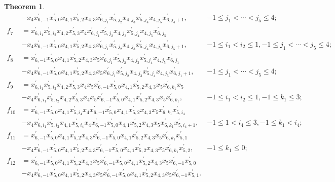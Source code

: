 \documentclass[UTF8]{amsart}
\newtheorem{theorem}[tpcl]{Theorem}
\theoremstyle{definition}
\theoremstyle{remark}
\numberwithin{equation}{section}
\begin{document}
\begin{theorem}
\begin{align*}
    &-x_4x_{6,-1}^{'}x_{5,0}^{'}x_{4,1}x_{5,2}^{'}x_{4,3}x_{6,j_1}^{'}x_{5,j_2}^{'}x_{4,j_3}x_{5,j_4}^{'}x_{4,j_5}x_{6,j_4+1}^{'},&-1\leq   j_1<\cdots<j_5\leq 4;\\
f_7&=x_{6,i_1}^{'}x_{5,i_2}^{'}x_{4,2}x_{5,3}^{'}x_{4}x_{6,j_1}^{'}x_{5,j_2}^{'}x_{4,j_3}x_{5,j_4}^{'}x_{4,j_5}x_{6,j_5}^{'}&\\
    &-x_4x_{6,-1}^{'}x_{5,0}^{'}x_{4,1}x_{5,2}^{'}x_{4,3}x_{6,j_1}^{'}x_{5,j_2}^{'}x_{4,j_3}x_{5,j_4}^{'}x_{4,j_5}x_{6,j_5+1}^{'},&-1\leq  i_1<i_2\leq 1, -1\leq j_1<\cdots<j_5\leq 4;\\
f_8&=x_{6,-1}^{'}x_{5,0}^{'}x_{4,1}x_{5,2}^{'}x_{4,3}x_5x_{6,j_1}^{'}x_{5,j_2}^{'}x_{4,j_3}x_{5,j_4}^{'}x_{4,j_5}x_{6,j_1}^{'}&\\
    &-x_4x_{6,-1}^{'}x_{5,0}^{'}x_{4,1}x_{5,2}^{'}x_{4,3}x_5x_{6,j_1}^{'}x_{5,j_2}^{'}x_{4,j_3}x_{5,j_4}^{'}x_{4,j_5}x_{6,j_1+1}^{'},& -1\leq  j_1<\cdots<j_5\leq 4;\\
f_9&=x_{6,i_1}^{'}x_{5,i_2}^{'}x_{4,2}x_{5,3}^{'}x_{4}x_5x_{6,-1}^{'}x_{5,0}^{'}x_{4,1}x_{5,2}^{'}x_{4,3}x_5x_{6,k_1}^{'}x_5&\\
    &-x_4x_{6,i_1}^{'}x_{5,i_2}^{'}x_{4,2}x_{5,3}^{'}x_{4}x_5x_{6,-1}^{'}x_{5,0}^{'}x_{4,1}x_{5,2}^{'}x_{4,3}x_5x_{6,k_1}^{'},& -1\leq  i_1<i_2\leq 1,-1\leq k_1\leq 3;\\
f_{10}&=x_{6,-1}^{'}x_{5,0}^{'}x_{4,1}x_{5,i_4}^{'}x_{4}x_{6,-1}^{'}x_{5,0}^{'}x_{4,1}x_{5,2}^{'}x_{4,3}x_5x_{6,k_1}^{'}x_{5,i_4}^{'}&\\
    &-x_4x_{6,i_1}^{'}x_{5,i_2}^{'}x_{4,1}x_{5,i_4}^{'}x_{4}x_{6,-1}^{'}x_{5,0}^{'}x_{4,1}x_{5,2}^{'}x_{4,3}x_5x_{6,k_1}^{'}x_{5,i_4+1}^{'},& -1\leq  1<i_4\leq 3,-1\leq k_1< i_4;\\
f_{11}&=x_{6,-1}^{'}x_{5,0}^{'}x_{4,1}x_{5,2}^{'}x_{4,3}x_{6,-1}^{'}x_{5,0}^{'}x_{4,1}x_{5,2}^{'}x_{4,3}x_5x_{6,k_1}^{'}x_{5,1}^{'}&\\
    &-x_4x_{6,-1}^{'}x_{5,0}^{'}x_{4,1}x_{5,2}^{'}x_{4,3}x_{6,-1}^{'}x_{5,0}^{'}x_{4,1}x_{5,2}^{'}x_{4,3}x_5x_{6,k_1}^{'}x_{5,2}^{'},& -1\leq  k_1\leq 0;\\
f_{12}&=x_{6,-1}^{'}x_{5,0}^{'}x_{4,1}x_{5,2}^{'}x_{4,3}x_5x_{6,-1}^{'}x_{5,0}^{'}x_{4,1}x_{5,2}^{'}x_{4,3}x_5x_{6,-1}^{'}x_{5,0}^{'}&\\
    &-x_4x_{6,-1}^{'}x_{5,0}^{'}x_{4,1}x_{5,2}^{'}x_{4,3}x_5x_{6,-1}^{'}x_{5,0}^{'}x_{4,1}x_{5,2}^{'}x_{4,3}x_5x_{6,-1}^{'}x_{5,1}^{'}.&  \\
\end{align*}
\end{theorem}
\end{document}

